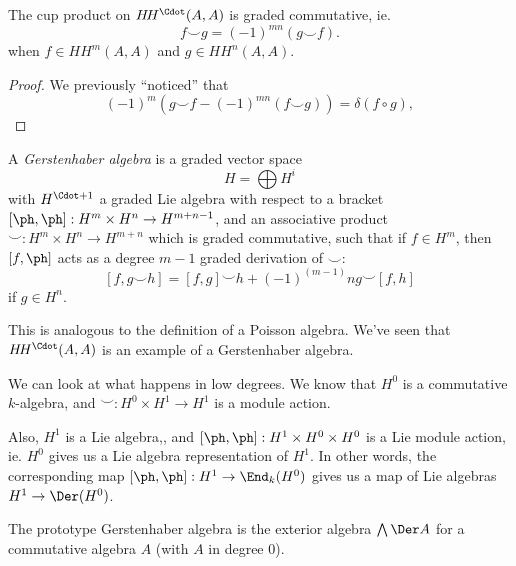 \documentclass[a4paper]{article}
\newcommand\HH{H\!H}
\begin{document}
\begin{lemma}
  The cup product on $\HH^\Cdot(A, A)$ is graded commutative, ie.
  \[
    f \smile g = (-1)^{mn} (g \smile f).
  \]
  when $f \in \HH^m(A, A)$ and $g \in \HH^n(A, A)$.
\end{lemma}

\begin{proof}
  We previously ``noticed'' that
  \[
    (-1)^m(g \smile f - (-1)^{mn} (f \smile g)) = \delta (f \circ g),
  \]
\end{proof}

\begin{defi}
  A \emph{Gerstenhaber algebra} is a graded vector space
  \[
    H = \bigoplus H^i
  \]
  with $H^{\Cdot + 1}$ a graded Lie algebra with respect to a bracket $[\ph, \ph]: H^m \times H^n \to H^{m + n - 1}$, and an associative product $\smile: H^m \times H^n \to H^{m + n}$ which is graded commutative, such that if $f \in H^m$, then $[f, \ph]$ acts as a degree $m - 1$ graded derivation of $\smile$:
  \[
    [f, g \smile h] = [f, g] \smile h + (-1)^{(m - 1)}n g \smile [f, h]
  \]
  if $g \in H^n$.
\end{defi}
This is analogous to the definition of a Poisson algebra. We've seen that $\HH^\Cdot(A, A)$ is an example of a Gerstenhaber algebra.

We can look at what happens in low degrees. We know that $H^0$ is a commutative $k$-algebra, and $\smile: H^0 \times H^1 \to H^1$ is a module action.

Also, $H^1$ is a Lie algebra,, and $[\ph, \ph]: H^1 \times H^0 \times H^0$ is a Lie module action, ie. $H^0$ gives us a Lie algebra representation of $H^1$. In other words, the corresponding map $[\ph, \ph]: H^1 \to \End_k(H^0)$ gives us a map of Lie algebras $H^1 \to \Der(H^0)$.

The prototype Gerstenhaber algebra is the exterior algebra $\bigwedge \Der A$ for a commutative algebra $A$ (with $A$ in degree $0$).
\end{document}

